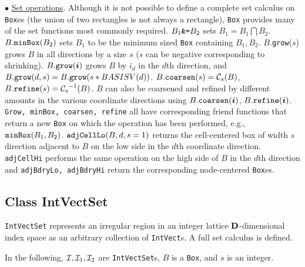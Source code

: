 \begin{trivlist}
\item $\bullet$ \underline{Set operations}.  Although it is not possible to define a
complete set calculus on {\tt{Box}}es (the union of two rectangles is
not always a rectangle), 
{\tt{Box}} provides many of the set functions most commonly
required.  $B_1 \mbox{{\tt{\&=}}} B_2$ sets $B_1 = B_1 \bigcap B_2$.
$B.{\tt{minBox}}(B_2)$ sets $B_1$ to be the minimum sized {\tt{Box}} containing
$B_1,B_2$.  $B$.{\tt{grow}}($s$) grows $B$ in all directions by a
size $s$ ($s$ can be negative corresponding to shrinking).
$B.{\tt{grow}}({\boldsymbol{i}})$ grows $B$ by $i_d$ in the $d$th
direction, and $B.{\tt{grow}}(d,s) = B.{\tt{grow}}(s*BASISV(d))$.
$B.{\tt{coarsen}}(s) = {\mathcal{C}_s}(B)$, $B.{\tt{refine}}(s) =
{\mathcal{C}_s}^{-1}(B)$.  
$B$ can also be coarsened and refined by
different amounts in the various coordinate directions using
$B.{\tt{coarsen}}({\boldsymbol{i}})$, $B.{\tt{refine}}({\boldsymbol{i}})$. {\tt Grow,
minBox, coarsen, refine} all have corresponding friend functions that
return a new {\tt Box} on which the operation has been performed,
e.g., ${\tt{minBox}}(B_1, B_2)$.  ${\tt{adjCellLo}}(B, d, s = 1)$
returns the cell-centered box of width $s$ direction adjacent to $B$
on the low side in the $d$th coordinate direction.  {\tt{adjCellHi}} performs the same operation on the high side of $B$
in the $d$th direction and {\tt{adjBdryLo, adjBdryHi}} return the
corresponding node-centered {\tt{Box}}es.

\end{trivlist}


\subsection{Class IntVectSet}
\label{sec:ivs}

\verb|IntVectSet| represents an irregular region in an integer lattice
${\mathbf{D}}$-dimensional index space as an arbitrary collection of
\verb|IntVect|s.  A full set calculus
is defined.

  In the
following, ${\cal I}, {\cal I}_1, {\cal I}_2$ 
are {\tt IntVectSet}s, $B$ is a {\tt Box},
and $s$ is an integer.

